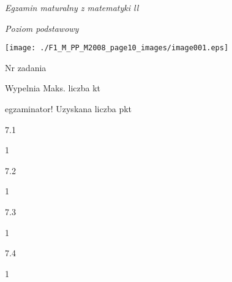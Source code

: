 \documentclass[a4paper,12pt]{article}
\begin{document}
{\it Egzamin maturalny z matematyki ll}

{\it Poziom podstawowy}
\begin{center}
\texttt{[image: ./F1\_M\_PP\_M2008\_page10\_images/image001.eps]}
\end{center}
Nr zadania

Wypelnia Maks. liczba kt

egzaminator! Uzyskana liczba pkt

7.1

1

7.2

1

7.3

1

7.4

1
\end{document}
